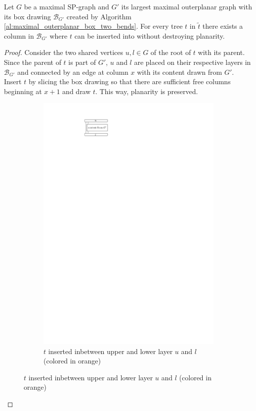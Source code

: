 \begin{lemma}
	Let $G$ be a maximal SP-graph and $G'$ its largest maximal outerplanar graph with its box drawing $\mathcal{B}_{G'}$ created by Algorithm \ref{al:maximal_outerplanar_box_two_bends}. For every tree $t$ in $\tilde{t}$ there exists a column in $\mathcal{B}_{G'}$ where $t$ can be inserted into without destroying planarity. 
\end{lemma}
\begin{proof}
	Consider the two shared vertices $u,l \in G$ of the root of $t$ with its parent. Since the parent of $t$ is part of $G'$, $u$ and $l$ are placed on their respective layers in $\mathcal{B}_{G'}$ and connected by an edge at column $x$ with its content drawn from $G'$. Insert $t$ by slicing the box drawing so that there are sufficient free columns beginning at $x+1$ and draw $t$. This way, planarity is preserved. 
	
	\begin{figure}[H]
	\centering
	\begin{subfigure}{\textwidth}
		\centering
		\includegraphics[page=2,width=0.6\linewidth]{graphics/t_insertion_into_maximal_outerplanar.pdf}
		\caption{$t$ inserted inbetween upper and lower layer $u$ and $l$ (colored in orange)}
	\end{subfigure}
	
\end{figure}
	
\end{proof}

